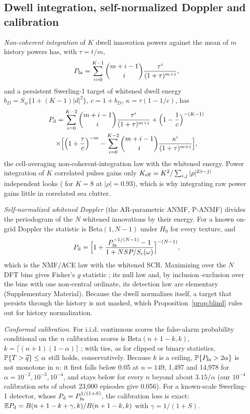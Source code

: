 \subsection{Dwell integration, self-normalized Doppler and calibration}
\emph{Non-coherent integration} of $K$ dwell innovation powers against the mean of $m$ history powers has, with $\tau=t/m$,
\begin{equation}
P_{\rm fa}=\sum_{i=0}^{K-1}\binom{m+i-1}{i}\frac{\tau^i}{(1+\tau)^{m+i}},
\label{eq:dwellpfa}
\end{equation}
and a persistent Swerling-1 target of whitened dwell energy $b_D=S_w\{1+(K-1)|d|^2\}$, $c=1+b_D$, $\kappa=\tau(1-1/c)$, has
\begin{multline}
P_{\rm d}=\sum_{i=0}^{K-2}\binom{m+i-1}{i}\frac{\tau^i}{(1+\tau)^{m+i}}+\Big(1-\frac1c\Big)^{-(K-1)}\\
\times\Big[\Big(1+\frac{\tau}{c}\Big)^{-m}-\sum_{i=0}^{K-2}\binom{m+i-1}{i}\frac{\kappa^i}{(1+\tau)^{m+i}}\Big],
\label{eq:dwellpd}
\end{multline}
the cell-averaging non-coherent-integration law \cite{gandhi1988,richards2014} with the whitened energy. Power integration of $K$ correlated pulses gains only $K_{\rm eff}=K^2/\sum_{i,j}|\rho|^{2|i-j|}$ independent looks (\ThKeff{} for $K=8$ at $|\rho|=0.93$), which is why integrating raw power gains little in correlated sea clutter.

\emph{Self-normalized whitened Doppler} (the AR-parametric ANMF, P-ANMF) divides the periodogram of the $N$ whitened innovations by their energy. For a known on-grid Doppler the statistic is Beta$(1,N-1)$ under $H_0$ for every texture, and
\begin{equation}
P_{\rm d}=\Big[1+\frac{P_{\rm fa}^{-1/(N-1)}-1}{1+N S P/S_c(\omega)}\Big]^{-(N-1)},
\label{eq:panmf}
\end{equation}
which is the NMF/ACE law \cite{kraut1999,conte1995} with the whitened SCR. Maximizing over the $N$ DFT bins gives Fisher's $g$ statistic \cite{fisher1929g}; its null law and, by inclusion–exclusion over the bins with one non-central ordinate, its detection law are elementary (Supplementary Material). Because the dwell normalizes itself, a target that persists through the history is not masked, which Proposition~\ref{prop:blind} rules out for history normalization.

\emph{Conformal calibration.} For i.i.d. continuous scores the false-alarm probability conditional on the $n$ calibration scores is Beta$(n+1-k,k)$, $k=\lceil(n+1)(1-\alpha)\rceil$ \cite{vovk2012}; with ties, as for clipped or binary statistics, $\mathbb{P}\{T>\widehat q\}\le\alpha$ still holds, conservatively. Because $k$ is a ceiling, $\mathbb{P}\{P_{\rm fa}>2\alpha\}$ is not monotone in $n$: it first falls below 0.05 at $n=149$, 1,497 and 14,978 for $\alpha=10^{-2},10^{-3},10^{-4}$, and stays below for every $n$ beyond about $3.15/\alpha$ (our $10^{-4}$ calibration sets of about 23,000 episodes give 0.056). For a known-scale Swerling-1 detector, whose $P_{\rm d}=P_{\rm fa}^{1/(1+S)}$, the calibration loss is exact: $\mathbb E P_{\rm d}=B(n+1-k+\gamma,k)/B(n+1-k,k)$ with $\gamma=1/(1+S)$.

